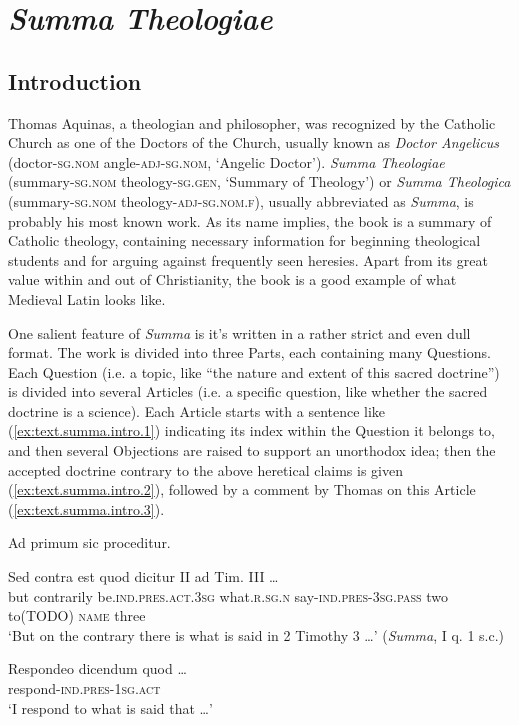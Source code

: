\documentclass[a4paper, oneside, 12pt]{report}
\newcommand{\form}[1]{\emph{#1}}
\newcommand*{\category}[1]{\textsc{#1}}
\newcommand{\translate}[1]{`#1'}
\newcommand{\literature}[1]{\textit{#1}}
\begin{document}
\section{\literature{Summa Theologiae}}

\subsection{Introduction}

Thomas Aquinas, a theologian and philosopher, 
was recognized by the Catholic Church 
as one of the Doctors of the Church,
usually known as \form{Doctor Angelicus} 
(doctor-\category{sg.nom} angle-\category{adj}-\category{sg.nom}, 
\translate{Angelic Doctor}).
\literature{Summa Theologiae}
(summary-\category{sg.nom} theology-\category{sg.gen}, \translate{Summary of Theology}) 
or \literature{Summa Theologica} 
(summary-\category{sg.nom} theology-\category{adj}-\category{sg.nom.f}),
usually abbreviated as \literature{Summa},
is probably his most known work.
As its name implies, the book is a summary of Catholic theology,
containing necessary information for 
beginning theological students 
and for arguing against frequently seen heresies. 
Apart from its great value within and out of Christianity, 
the book is a good example of 
what Medieval Latin looks like.

One salient feature of \literature{Summa} is 
it's written in a rather strict and even dull format.
The work is divided into three Parts,
each containing many Questions.
Each Question (i.e. a topic, like ``the nature and extent of this sacred doctrine'') 
is divided into several Articles 
(i.e. a specific question, like whether the sacred doctrine is a science).
Each Article starts with a sentence like (\ref{ex:text.summa.intro.1}) indicating its index 
within the Question it belongs to,
and then several Objections are raised 
to support an unorthodox idea;
then the accepted doctrine contrary to the above heretical claims is given
(\ref{ex:text.summa.intro.2}),
followed by a comment by Thomas on this Article (\ref{ex:text.summa.intro.3}).


\begin{exe}
    \ex\label{ex:text.summa.intro.1} Ad primum sic proceditur. 
    
    \ex\label{ex:text.summa.intro.2} 
    \gll Sed contra est quod dicitur II ad Tim. III \dots \\ 
    but contrarily be.\category{ind}.\category{pres}.\category{act}.\category{3sg} 
    what.\category{r}.\category{sg.n} 
    say-\category{ind.pres}-\category{3sg.pass} two to(TODO) \category{name} three \\
    \glt \translate{But on the contrary there is what is said in 2 Timothy 3 \dots} 
    (\literature{Summa}, I q. 1 s.c.)

    \ex\label{ex:text.summa.intro.3} 
    \gll Respondeo dicendum quod \dots \\
    respond-\category{ind.pres}-\category{1sg.act} \\
    \glt \translate{I respond to what is said that \dots}
\end{exe}



\end{document}
